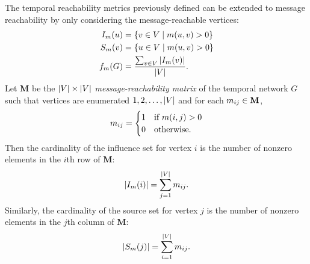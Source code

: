 The temporal reachability metrics previously defined can be extended to message reachability by only considering the message-reachable vertices:
%
\begin{align*}
	I_m(u) &= \{v \in V \mid m(u, v) > 0\} \\
	S_m(v) &= \{u \in V \mid m(u, v) > 0\} \\
	f_m(G) &= \frac{\sum_{v \in V} \left\vert I_m(v) \right\vert}{\left\vert V \right\vert} .
\end{align*}
%
Let $\mathbf{M}$ be the $\left\vert V \right\vert \times \left\vert V \right\vert$ \emph{message-reachability matrix} of the temporal network $G$ such that vertices are enumerated $1, 2, \ldots, \left\vert V \right\vert$ and for each $m_{ij} \in \mathbf{M}$,
%
\begin{equation*}
	m_{ij} = 
	   \begin{cases}
        	1 & \text{if } m(i, j) > 0 \\
        	0 & \text{otherwise.}
	   \end{cases}
\end{equation*}
%
Then the cardinality of the influence set for vertex $i$ is the number of nonzero elements in the $i$th row of $\mathbf{M}$:
%
\begin{equation}\label{eq:influence-size}
	\left\vert I_m(i) \right\vert = \sum_{j=1}^{\left\vert V \right\vert} m_{ij} .
\end{equation}
%
Similarly, the cardinality of the source set for vertex $j$ is the number of nonzero elements in the $j$th column of $\mathbf{M}$:
%
\begin{equation}\label{eq:source-size}
	\left\vert S_m(j) \right\vert = \sum_{i=1}^{\left\vert V \right\vert} m_{ij} .
\end{equation}

